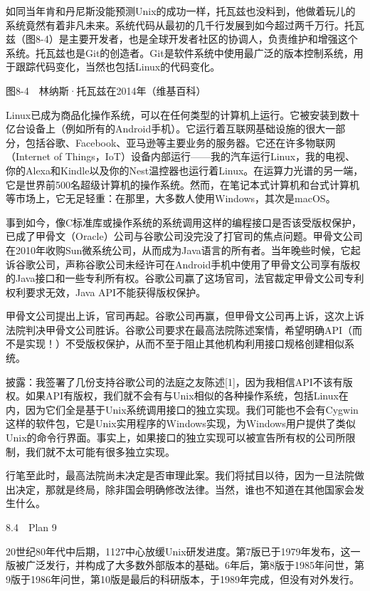 \documentclass[a4paper,12pt,UTF8,twoside]{ctexbook}
\begin{document}
如同当年肯和丹尼斯没能预测Unix的成功一样，托瓦兹也没料到，他做着玩儿的系统竟然有着非凡未来。系统代码从最初的几千行发展到如今超过两千万行。托瓦兹（图8-4）是主要开发者，也是全球开发者社区的协调人，负责维护和增强这个系统。托瓦兹也是Git的创造者。Git是软件系统中使用最广泛的版本控制系统，用于跟踪代码变化，当然也包括Linux的代码变化。



图8-4　林纳斯·托瓦兹在2014年（维基百科）

Linux已成为商品化操作系统，可以在任何类型的计算机上运行。它被安装到数十亿台设备上（例如所有的Android手机）。它运行着互联网基础设施的很大一部分，包括谷歌、Facebook、亚马逊等主要业务的服务器。它还在许多物联网（Internet of Things，IoT）设备内部运行——我的汽车运行Linux，我的电视、你的Alexa和Kindle以及你的Nest温控器也运行着Linux。在运算力光谱的另一端，它是世界前500名超级计算机的操作系统。然而，在笔记本式计算机和台式计算机等市场上，它无足轻重：在那里，大多数人使用Windows，其次是macOS。

事到如今，像C标准库或操作系统的系统调用这样的编程接口是否该受版权保护，已成了甲骨文（Oracle）公司与谷歌公司没完没了打官司的焦点问题。甲骨文公司在2010年收购Sun微系统公司，从而成为Java语言的所有者。当年晚些时候，它起诉谷歌公司，声称谷歌公司未经许可在Android手机中使用了甲骨文公司享有版权的Java接口和一些专利所有权。谷歌公司赢了这场官司，法官裁定甲骨文公司专利权利要求无效，Java API不能获得版权保护。

甲骨文公司提出上诉，官司再起。谷歌公司再赢，但甲骨文公司再上诉，这次上诉法院判决甲骨文公司胜诉。谷歌公司要求在最高法院陈述案情，希望明确API（而不是实现！）不受版权保护，从而不至于阻止其他机构利用接口规格创建相似系统。

披露：我签署了几份支持谷歌公司的法庭之友陈述[1]，因为我相信API不该有版权。如果API有版权，我们就不会有与Unix相似的各种操作系统，包括Linux在内，因为它们全是基于Unix系统调用接口的独立实现。我们可能也不会有Cygwin这样的软件包，它是Unix实用程序的Windows实现，为Windows用户提供了类似Unix的命令行界面。事实上，如果接口的独立实现可以被宣告所有权的公司所限制，我们就不太可能有很多独立实现。

行笔至此时，最高法院尚未决定是否审理此案。我们将拭目以待，因为一旦法院做出决定，那就是终局，除非国会明确修改法律。当然，谁也不知道在其他国家会发生什么。





8.4　Plan 9


20世纪80年代中后期，1127中心放缓Unix研发进度。第7版已于1979年发布，这一版被广泛发行，并构成了大多数外部版本的基础。6年后，第8版于1985年问世，第9版于1986年问世，第10版是最后的科研版本，于1989年完成，但没有对外发行。
\end{document}

